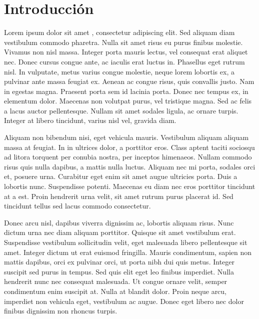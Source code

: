 





\chapter{Introducción}

Lorem ipsum dolor sit amet \cite{robomind-web}, consectetur adipiscing elit. Sed aliquam diam vestibulum commodo pharetra. Nulla sit amet risus eu purus finibus molestie. Vivamus non nisl massa. Integer porta mauris lectus, vel consequat erat aliquet nec. Donec cursus congue ante, ac iaculis erat luctus in. Phasellus eget rutrum nisl. In vulputate, metus varius congue molestie, neque lorem lobortis ex, a pulvinar ante massa feugiat ex. Aenean ac congue risus, quis convallis justo. Nam in egestas magna. Praesent porta sem id lacinia porta. Donec nec tempus ex, in elementum dolor. Maecenas non volutpat purus, vel tristique magna. Sed ac felis a lacus auctor pellentesque. Nullam sit amet sodales ligula, ac ornare turpis. Integer at libero tincidunt, varius nisl vel, gravida diam.

Aliquam non bibendum nisi, eget vehicula mauris. Vestibulum aliquam aliquam massa at feugiat. In in ultrices dolor, a porttitor eros. Class aptent taciti sociosqu ad litora torquent per conubia nostra, per inceptos himenaeos. Nullam commodo risus quis nulla dapibus, a mattis nulla luctus. Aliquam nec mi porta, sodales orci et, posuere urna. Curabitur eget enim sit amet augue ultricies porta. Duis a lobortis nunc. Suspendisse potenti. Maecenas eu diam nec eros porttitor tincidunt at a est. Proin hendrerit urna velit, sit amet rutrum purus placerat id. Sed tincidunt tellus sed lacus commodo consectetur.

Donec arcu nisl, dapibus viverra dignissim ac, lobortis aliquam risus. Nunc dictum urna nec diam aliquam porttitor. Quisque sit amet vestibulum erat. Suspendisse vestibulum sollicitudin velit, eget malesuada libero pellentesque sit amet. Integer dictum ut erat euismod fringilla. Mauris condimentum, sapien non mattis dapibus, orci ex pulvinar orci, ut porta nibh dui quis metus. Integer suscipit sed purus in tempus. Sed quis elit eget leo finibus imperdiet. Nulla hendrerit nunc nec consequat malesuada. Ut congue ornare velit, semper condimentum enim suscipit at. Nulla at blandit dolor. Proin neque arcu, imperdiet non vehicula eget, vestibulum ac augue. Donec eget libero nec dolor finibus dignissim non rhoncus turpis.


